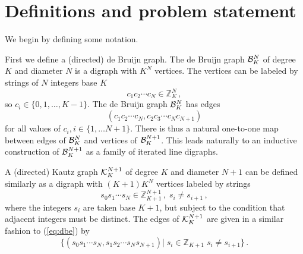 \documentclass[12pt]{article}
\def\bbz{{\mathbb Z}}
\begin{document}
\section{Definitions and problem statement}

We begin by defining some notation.

First we define a (directed) de Bruijn graph.  The de Bruijn graph 
${\cal B}_K^N$ of degree
$K$ and diameter $N$ 
is a digraph with $K^N$ vertices.  The vertices can be labeled
by strings of $N$ integers base $K$
\begin{equation}
c_1 c_2 \cdots c_N \in \bbz_K^N \,,
\end{equation}
so $c_i \in\{0, 1, \ldots, K -1\}$.  The  de Bruijn graph 
${\cal B}_K^N$
has edges
\begin{equation}
(c_1 c_2 \cdots c_N,
c_2 c_3 \cdots c_N c_{N + 1})
\label{eq:dbe}
\end{equation}
for all values of $c_i, i \in\{1, \ldots N + 1\}$.
There is thus a natural one-to-one map between edges of ${\cal B}_K^N$
and vertices of ${\cal B}_K^{N + 1}$.  This leads naturally to an
inductive construction of ${\cal B}_K^{N + 1}$ as a family of iterated
line digraphs.

A (directed)  Kautz graph ${\cal K}_K^{N + 1}$ of degree $K$ and diameter $N + 1$
can be defined similarly as a digraph with $(K +1)K^{N}$
vertices labeled by strings
\begin{equation}
s_0  s_1 \cdots  s_N \in \bbz_{K + 1}^{N + 1} \,, \; s_i \neq s_{i + 1} \,,
\end{equation}
where the integers $s_i$
are taken base $K + 1$, but subject to the condition that
adjacent integers must
be distinct.  The edges of ${\cal K}_K^{N + 1}$ are given in a similar
fashion to (\ref{eq:dbe}) by
\begin{equation}
\{(s_0 s_1 \cdots s_N,
s_1 s_2 \cdots s_N s_{N + 1})| \; s_i \in \bbz_{K +1} \; s_i \neq s_{i
  + 1} \} \,.
\end{equation}
\end{document}
